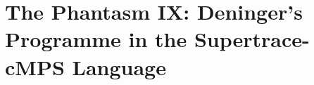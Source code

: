 
\section{The Phantasm IX: Deninger's Programme in the Supertrace-cMPS Language}
\label{sec:deninger-cmps}


